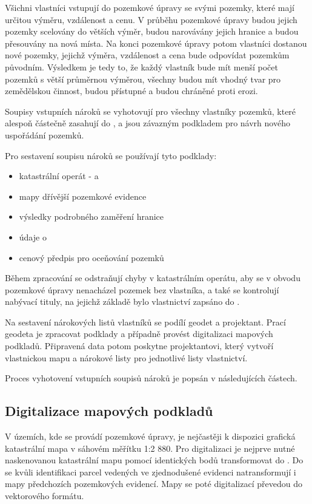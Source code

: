 Všichni vlastníci vstupují do pozemkové úpravy se svými pozemky, které mají určitou výměru, vzdálenost a cenu. V průběhu pozemkové úpravy budou jejich pozemky scelovány do větších výměr, budou narovávány jejich hranice a budou přesouvány na nová místa. Na konci pozemkové úpravy potom vlastníci dostanou nové pozemky, jejichž výměra, vzdálenost a cena bude odpovídat pozemkům původním. Výsledkem je tedy to, že každý vlastník bude mít menší počet pozemků s větší průměrnou výměrou, všechny budou mít vhodný tvar pro zemědělskou činnost, budou přístupné a budou chráněné proti erozi.

Soupisy vstupních nároků se vyhotovují pro všechny vlastníky pozemků, které alespoň částečně zasahují do , a jsou závazným podkladem pro návrh nového uspořádání pozemků.

Pro sestavení soupisu nároků se používají tyto podklady:
	\begin{itemize}[leftmargin=1.5cm]
		\item katastrální operát -  a 
		\item mapy dřívější pozemkové evidence
		\item výsledky podrobného zaměření hranice 
		\item údaje o 
		\item cenový předpis pro oceňování pozemků
	\end{itemize}

Během zpracování  se odstraňují chyby v katastrálním operátu, aby se v obvodu pozemkové úpravy nenacházel pozemek bez vlastníka, a také se kontrolují nabývací tituly, na jejichž základě bylo vlastnictví zapsáno do .

Na sestavení nárokových listů vlastníků se podílí geodet a projektant. Prací geodeta je zpracovat podklady a případně provést digitalizaci mapových podkladů. Připravená data potom poskytne projektantovi, který vytvoří vlastnickou mapu a nárokové listy pro jednotlivé listy vlastnictví.

Proces vyhotovení vstupních soupisů nároků je popsán v následujících částech.

\subsection{Digitalizace mapových podkladů}
\label{digitalizace}

V územích, kde se provádí pozemkové úpravy, je nejčastěji k dispozici grafická katastrální mapa v sáhovém měřítku 1:2 880. Pro digitalizaci je nejprve nutné naskenovanou katastrální mapu pomocí identických bodů transformovat do . Do  se kvůli identifikaci parcel vedených ve zjednodušené evidenci natransformují i mapy předchozích pozemkových evidencí. Mapy se poté digitalizací převedou do vektorového formátu.

